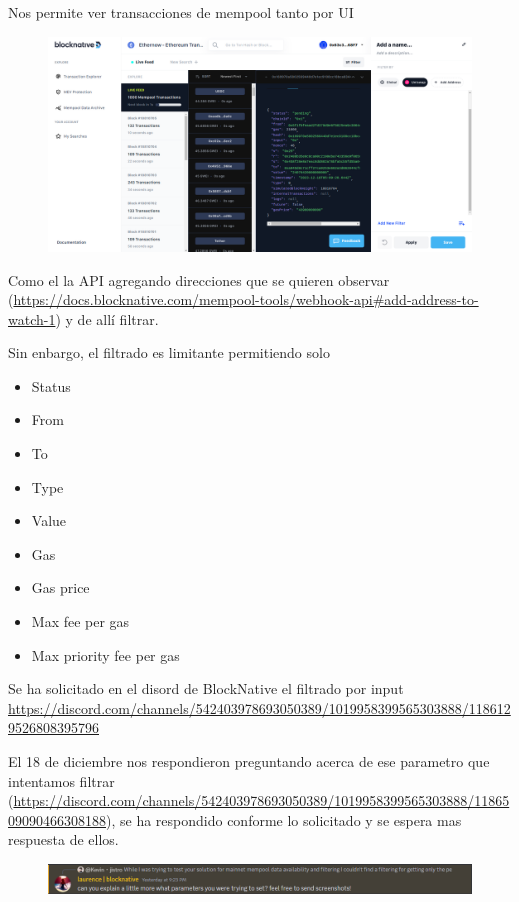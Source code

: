 Nos permite ver transacciones de mempool tanto por UI
\begin{figure}
    \centering
    \includegraphics[width=1\linewidth]{img//screenshots/brave_screenshot_ethnopw.png}
\end{figure}

Como el la API agregando direcciones que se quieren observar (\url{https://docs.blocknative.com/mempool-tools/webhook-api#add-address-to-watch-1}) y de allí filtrar.

Sin enbargo, el filtrado es limitante permitiendo solo 
\begin{multicols}{3}
\begin{itemize}
    \item Status
    \item From
    \item To
    \item Type
    \item Value
    \item Gas
    \item Gas price
    \item Max fee per gas
    \item Max priority fee per gas
\end{itemize}
\end{multicols}

Se ha solicitado en el disord de BlockNative  el filtrado por input \url{https://discord.com/channels/542403978693050389/1019958399565303888/1186129526808395796}

El 18 de diciembre nos respondieron preguntando acerca de ese parametro que intentamos filtrar (\url{https://discord.com/channels/542403978693050389/1019958399565303888/1186509090466308188}), se ha respondido conforme lo solicitado y se espera mas respuesta de ellos.

\begin{figure}
    \centering
    \includegraphics[width=1\linewidth]{img//screenshots/imagesc.png}
\end{figure}

